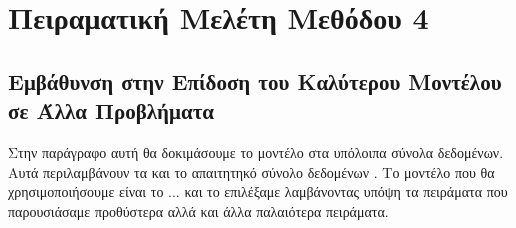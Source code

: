 \begin{table}[h]
    \begin{center}
    \end{center}
    \caption[]{\label{tab:method_3_SmallNORB_final}Επίδωση των αλγορίθμων της μεθόδου 3 στο σύνολο δεδομένων , όταν χρησιμοποιούνται 30 εποχές για την εκπαίδευση του μοντέλου με μέγεθος δέσμης 8.} 
\end{table}


\section{Πειραματική Μελέτη Μεθόδου 4}

\subsection{Εμβάθυνση στην Επίδοση του Καλύτερου Μοντέλου σε Άλλα Προβλήματα}
Στην παράγραφο αυτή θα δοκιμάσουμε το  μοντέλο στα υπόλοιπα σύνολα δεδομένων. Αυτά περιλαμβάνουν τα  και το απαιτητηκό σύνολο δεδομένων . Το μοντέλο που θα χρησιμοποιήσουμε είναι το ... και το επιλέξαμε λαμβάνοντας υπόψη τα πειράματα που παρουσιάσαμε προθύστερα αλλά και άλλα παλαιότερα πειράματα.\par

